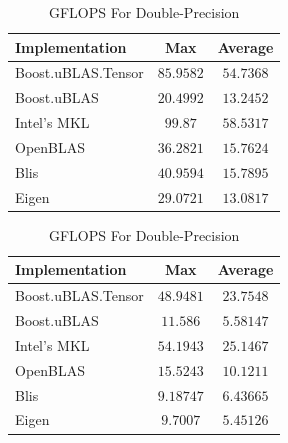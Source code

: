 \begin{table}[ht]
    \centering
    \caption{GFLOPS For Single-Precision}
    \begin{tabular}{|l|c|c|}
        \hline
        \textbf{Implementation} & \textbf{Max} & \textbf{Average}\\
        \hline
        Boost.uBLAS.Tensor  & $85.9582$ & $54.7368$ \\
        \hline
        Boost.uBLAS         & $20.4992$ & $13.2452$ \\
        \hline
        Intel's MKL         & $99.87$ & $58.5317$ \\
        \hline
        OpenBLAS            & $36.2821$ & $15.7624$ \\
        \hline
        Blis                & $40.9594$ & $15.7895$ \\
        \hline
        Eigen               & $29.0721$ & $13.0817$ \\
        \hline
    \end{tabular}

    \vspace*{1 cm}

    \centering
    \caption{GFLOPS For Double-Precision}
    \begin{tabular}{|l|c|c|}
        \hline
        \textbf{Implementation} & \textbf{Max} & \textbf{Average}\\
        \hline
        Boost.uBLAS.Tensor  & $48.9481$ & $23.7548$ \\
        \hline
        Boost.uBLAS         & $11.586$ & $5.58147$ \\
        \hline
        Intel's MKL         & $54.1943$ & $25.1467$ \\
        \hline
        OpenBLAS            & $15.5243$ & $10.1211$ \\
        \hline
        Blis                & $9.18747$ & $6.43665$ \\
        \hline
        Eigen               & $9.7007$ & $5.45126$ \\
        \hline
    \end{tabular}
\end{table}

